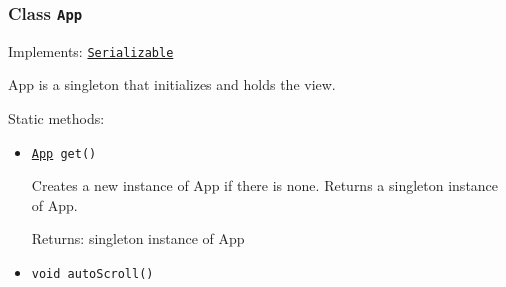 \subsubsection{Class \texttt{App}}
\label{type:edu.kit.wavelength.client.view.App}
Implements: \texttt{\hyperref[type:edu.kit.wavelength.client.model.serialization.Serializable]{Serializable}}

App is a singleton that initializes and holds the view.

Static methods:
\begin{itemize}
\item \texttt{\hyperref[type:edu.kit.wavelength.client.view.App]{App} get()}

Creates a new instance of App if there is none.
 Returns a singleton instance of App.

Returns: singleton instance of App

\item \texttt{void autoScroll()}



\end{itemize}

